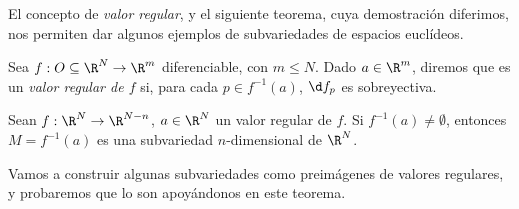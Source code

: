 El concepto de \emph{valor regular}, y el siguiente teorema, cuya demostración
diferimos, nos permiten dar algunos ejemplos de subvariedades de espacios
euclídeos.
\begin{ndef}
  Sea $f: O\subseteq\R^{N} \to \R^{m}$ diferenciable, con $m\le N$. Dado
  $a\in\R^{m}$, diremos que es un \emph{valor regular de $f$} si, para cada
  $p\in f^{-1}(a)$, $\d f_{p}$ es sobreyectiva.
\end{ndef}
\begin{nth} \label{thm:valores-regulares}
  Sean $f: \R^{N}\to \R^{N-n}$, $a\in\R^{N}$ un valor regular de $f$. Si
$f^{-1}(a) \ne \emptyset$, entonces $M=f^{-1}(a)$ es una subvariedad
$n$-dimensional de $\R^{N}$.
\end{nth}
Vamos a construir algunas subvariedades como preimágenes de valores regulares, y
probaremos que lo son apoyándonos en este teorema.

